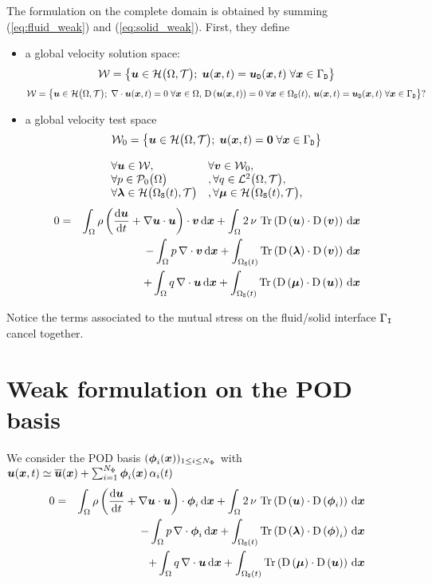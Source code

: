 \documentclass[10pt,a4paper]{article}
\begin{document}
The formulation on the complete domain is obtained by summing (\ref{eq:fluid_weak}) and (\ref{eq:solid_weak}). First, they define
\begin{itemize}
\item a global velocity solution space: 
$$\sW = \left\{\vu \in \sH\big(\dom, \sT\big);\;\vu(\vx, t) = \vud(\vx, t)\; \forall \vx \in \boud \right\}$$
$$\sW = \left\{\vu \in \sH\big(\dom, \sT\big);\;\div \vu(\vx, t)=0\; \forall \vx \in \dom,\,\D{\vu(\vx, t)}=0\; \forall \vx \in \doms(t),\,\vu(\vx, t) = \vud(\vx, t)\; \forall \vx \in \boud \right\}?$$
\item a global velocity test space 
$$\sW_0 = \left\{\vu \in \sH\big(\dom, \sT\big);\;\vu(\vx, t) = \vec 0 \; \forall \vx \in \boud \right\}$$
\end{itemize}
$$
\begin{array}{ll}
\forall \vu \in \sW, & \forall \vv \in \sW_0, \\
\forall p \in \sP_0\big(\dom\big) &,  \forall q \in \sL^2\big(\dom, \sT\big), \\
\forall \vlambda \in \sH\big(\doms(t),\sT\big)&,  \forall \vmu \in \sH\big(\doms(t),\sT\big), \\
\end{array}
$$
\begin{eqnarray}
\nonumber 0 &=& 
\int_{\dom}\rho\left(\dt \vu + \grad \vu \cdot \vu\right)\cdot\vv \,\d\vx + \int_{\dom}2\,\nu\,\trace{\D{\vu}\cdot\D{\vv}} \, \d\vx\\
\nonumber & & - \int_{\dom} p\,\div \vv \,\d\vx + \int_{\doms(t)}\trace{\D\vlambda \cdot \D \vv }\, \d \vx \\
\label{eq:solid_weak} & & + \int_{\dom} q\,\div \vu \,\d\vx + \int_{\doms(t)}\trace{\D\vmu \cdot\D \vu}\,\d \vx
\end{eqnarray}
%

Notice the terms associated to the mutual stress on the fluid/solid interface $\boui$ cancel together.
%

\section{Weak formulation on the POD basis}
We consider the POD basis $(\vphi_i(\vx))_{1 \leq i \leq N_\Phi}$ with $\vu(\vx, t)\simeq \bu(\vx) + \sum_{i=1}^{N_\Phi}\vphi_i(\vx)\,\alpha_i(t)$
\begin{eqnarray}
\nonumber 0 &=& 
\int_{\dom}\rho\left(\dt \vu + \grad \vu \cdot \vu\right)\cdot\vphi_i \,\d\vx + \int_{\dom}2\,\nu\,\trace{\D{\vu}\cdot\D{\vphi_i}} \, \d\vx\\
\nonumber & & - \int_{\dom} p\,\div \vphi_i \,\d\vx + \int_{\doms(t)}\trace{\D\vlambda \cdot \D \vphi_i }\, \d \vx \\
\label{eq:solid_weak} & & + \int_{\dom} q\,\div \vu \,\d\vx + \int_{\doms(t)}\trace{\D\vmu \cdot\D \vu}\,\d \vx
\end{eqnarray}
\end{document}
